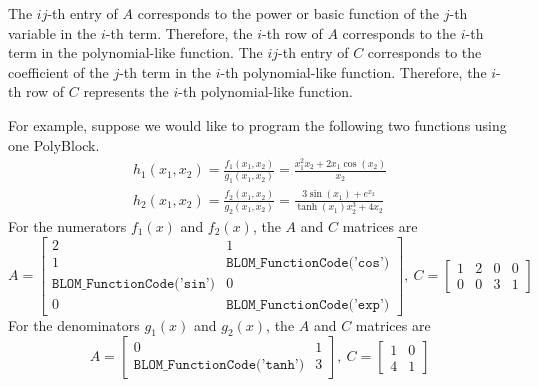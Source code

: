 \documentclass{article}
\begin{document}
The $ij$-th entry of $A$ corresponds to the power or basic function of the $j$-th variable in the $i$-th term. Therefore, the $i$-th row of $A$ corresponds to the $i$-th term in the polynomial-like function. The $ij$-th entry of $C$ corresponds to the coefficient of the $j$-th term in the $i$-th polynomial-like function. Therefore, the $i$-th row of $C$ represents the $i$-th polynomial-like function.

For example, suppose we would like to program the following two functions using one PolyBlock.
\begin{gather*}
h_1(x_1,x_2)=\frac{f_1(x_1,x_2)}{g_1(x_1,x_2)}=\frac{x_1^2x_2+2x_1\cos(x_2)}{x_2}\\
h_2(x_1,x_2)=\frac{f_2(x_1,x_2)}{g_2(x_1,x_2)}=\frac{3\sin(x_1)+e^{x_2}}{\tanh(x_1)x_2^3+4x_2}
\end{gather*}
For the numerators $f_1(x)$ and $f_2(x)$, the $A$ and $C$ matrices are
\[A=\begin{bmatrix}2&1\\1&\texttt{BLOM\_FunctionCode('cos')}\\\texttt{BLOM\_FunctionCode('sin')}&0\\0&\texttt{BLOM\_FunctionCode('exp')}\end{bmatrix},\: C=\begin{bmatrix}1&2&0&0\\0&0&3&1\end{bmatrix}\]
For the denominators $g_1(x)$ and $g_2(x)$, the $A$ and $C$ matrices are
\[A=\begin{bmatrix}0&1\\\texttt{BLOM\_FunctionCode('tanh')}&3\end{bmatrix},\: C=\begin{bmatrix}1&0\\4&1\end{bmatrix}\]
\end{document}
